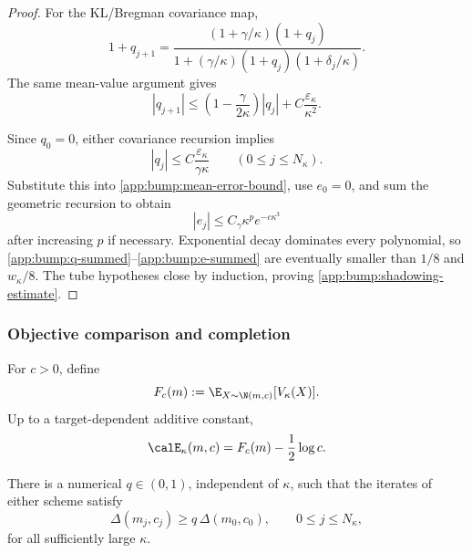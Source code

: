 \begin{proof}
For the KL/Bregman covariance map,
\begin{equation}
\label{app:bump:q-kl-exact}
    1+q_{j+1}
    =
    \frac{(1+\gamma/\kappa)(1+q_j)}
         {1+(\gamma/\kappa)(1+q_j)(1+\delta_j/\kappa)}.
\end{equation}
The same mean-value argument gives
\begin{equation}
\label{app:bump:q-kl-bound}
    |q_{j+1}|
    \leq\left(1-\frac{\gamma}{2\kappa}\right)|q_j|
    +C\frac{\varepsilon_\kappa}{\kappa^2}.
\end{equation}

Since \(q_0=0\), either covariance recursion implies
\begin{equation}
\label{app:bump:q-summed}
    |q_j|
    \leq C\frac{\varepsilon_\kappa}{\gamma\kappa}
    \qquad(0\leq j\leq N_\kappa).
\end{equation}
Substitute this into \eqref{app:bump:mean-error-bound}, use \(e_0=0\),
and sum the geometric recursion to obtain
\begin{equation}
\label{app:bump:e-summed}
    |e_j|\leq C_\gamma\kappa^p e^{-c\kappa^3}
\end{equation}
after increasing \(p\) if necessary.  Exponential decay dominates
every polynomial, so
\eqref{app:bump:q-summed}--\eqref{app:bump:e-summed} are eventually
smaller than \(1/8\) and \(w_\kappa/8\).  The tube hypotheses close by
induction, proving \eqref{app:bump:shadowing-estimate}.
\end{proof}

\subsubsection{Objective comparison and completion}

For \(c>0\), define
\begin{equation}
\label{app:bump:smoothed-potential}
    F_c(m):=\E_{X\sim\N(m,c)}[V_\kappa(X)].
\end{equation}
Up to a target-dependent additive constant,
\begin{equation}
\label{app:bump:scalar-objective}
    \calE_\kappa(m,c)=F_c(m)-\frac12\log c.
\end{equation}

\begin{lemma}
\label{app:bump:objective-gap}
There is a numerical \(q\in(0,1)\), independent of \(\kappa\), such
that the iterates of either scheme satisfy
\begin{equation}
\label{app:bump:gap-lower}
    \Delta(m_j,c_j)\geq q\,\Delta(m_0,c_0),
    \qquad 0\leq j\leq N_\kappa,
\end{equation}
for all sufficiently large \(\kappa\).
\end{lemma}

